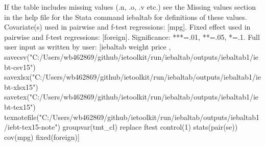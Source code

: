 If the table includes missing values (.n, .o, .v etc.) see the Missing values section in the help file for the Stata command iebaltab for definitions of these values. Covariate(s) used in pairwise and f-test regressions: [mpg]. Fixed effect used in pairwise and f-test regressions: [foreign]. Significance: ***=.01, **=.05, *=.1. Full user input as written by user: [iebaltab weight price , savecsv("C:/Users/wb462869/github/ietoolkit/run/iebaltab/outputs/iebaltab1/iebt-csv15") savexlsx("C:/Users/wb462869/github/ietoolkit/run/iebaltab/outputs/iebaltab1/iebt-xlsx15") savetex("C:/Users/wb462869/github/ietoolkit/run/iebaltab/outputs/iebaltab1/iebt-tex15") texnotefile("C:/Users/wb462869/github/ietoolkit/run/iebaltab/outputs/iebaltab1/iebt-tex15-note") groupvar(tmt\_cl) replace ftest control(1) stats(pair(se)) cov(mpg) fixed(foreign)] 
